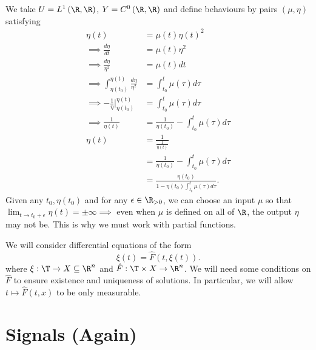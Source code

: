 
\begin{example}
	We take $U = L ^{1}\left( \R, \R \right) $, $Y = C ^{0}\left( \R, \R \right)$ and define behaviours by pairs $\left( \mu,  \eta  \right) $ satisfying 
	\begin{align*}
		\eta \left( t \right)  &=  \mu \left( t \right) \eta \left( t \right) ^2 \\
		\implies \frac{d\eta }{dt} &= \mu  \left( t \right) \eta ^2 \\
		\implies \frac{d\eta}{\eta ^2}  &= \mu \left( t \right) dt \\
		\implies \int_{\eta \left( t_0 \right) } ^{\eta \left( t \right) } \frac{d\eta}{\eta ^2}    &= \int_{t_0}^{t}   \mu \left( \tau  \right) d \tau \\
		\implies -\frac{1}{\eta }  |  ^{\eta \left( t \right)}  _{\eta (t_0)}	&= \int_{t_0}^{t} \mu  \left( \tau  \right) d \tau  \\
		\implies \frac{1}{\eta \left( t \right) } &= \frac{1}{\eta \left( t_0 \right) } - \int_{t_0}^{t} \mu \left( \tau  \right) d \tau   \\
		\eta \left( t \right)  &= \frac{1}{\frac{1}{\eta \left( t \right) }} \\
			&= \frac{1}{\eta \left( t_0 \right) } - \int_{t_0}^{t} \mu \left( \tau  \right) d \tau  \\
		&=  \frac{\eta \left( t_0 \right)}{1 - \eta  \left( t_0 \right)  \int_{t_0}^{t} \mu  \left( \tau  \right)  d \tau  }	
	.\end{align*}
	Given any $t_0, \eta  \left( t_0 \right) $ and for any $\epsilon \in  \R_{>0}$, we can choose an input $\mu $ so that $\lim_{t  \to t_0 + \epsilon}  \eta \left( t \right)  = \pm \infty \implies$ even when $\mu $ is defined on all of $\R$, the output $\eta $ may not be. This is why we must work with partial functions.
\end{example}

We will consider differential equations of the form 
\[
	\xi \left( t \right)  = \hat{F} \left( t, \xi \left( t \right)  \right) 
.\] 
where $\xi  : \T \to X \subseteq \R^{n}$ and $\hat{F} : \T \times  X  \to \R^{n}$. We will need some conditions on $\hat{F}$ to ensure existence and uniqueness of solutions. In particular, we will allow $t \longmapsto \hat{F}\left( t, x \right) $ to be only measurable. 

\section{Signals (Again)}

